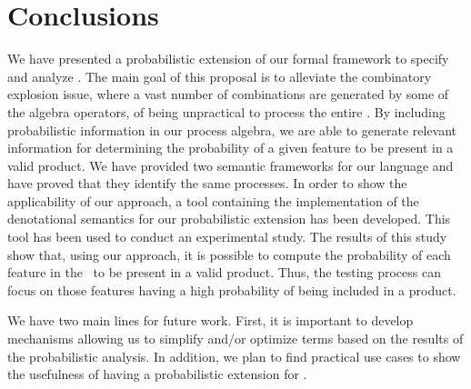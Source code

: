 \section{Conclusions}
\label{section:jstat:concs}

We have presented a probabilistic extension of our
formal framework to specify and analyze \SPLs. The main goal of this
proposal is to alleviate the combinatory explosion issue, where a vast
number of combinations are generated by some of the algebra operators,
of being unpractical to process the entire \SPL. By including probabilistic information in our process algebra, we are able to generate relevant information for determining the probability
of a given feature to be present in a valid product. We have provided two semantic frameworks for our language and have proved that they identify the same processes.
%
In order to show the applicability of our approach, a tool containing the
implementation of the denotational semantics for our probabilistic extension
has been developed. This tool has been used to conduct an experimental study.
%
The results of this study show that, using our approach, it is possible to compute
the probability of each feature in the \SPL\ to be present in a valid product.
Thus, the testing process can focus on those features having a high probability
of being included in a product.



%
%
%
%
We have two main lines for future work. First, it is important to develop
mechanisms allowing us to simplify and/or optimize terms
based on the results of the probabilistic analysis. In addition,
we plan to find practical use cases to show the usefulness of having a probabilistic extension for \SPLs.




